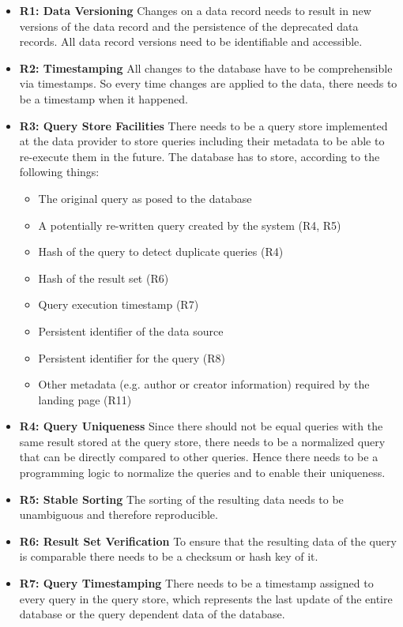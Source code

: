 \documentclass[draft,final]{vutinfth} %
\begin{document}
\begin{itemize}
	\item \textbf{R1: Data Versioning}
	Changes on a data record needs to result in new versions of the data record and the persistence of the deprecated data records. All data record versions need to be identifiable and accessible. 
	\item \textbf{R2: Timestamping}
	All changes to the database have to be comprehensible via timestamps. So every time changes are applied to the data, there needs to be a timestamp when it happened. 
	\item \textbf{R3: Query Store Facilities}
	There needs to be a query store implemented at the data provider to store queries including their metadata to be able to re-execute them in the future. The database has to store, according to \cite{rauber2016identification} the following things: 
	\begin{itemize}
		\item The original query as posed to the database
		\item A potentially re-written query created by the system (R4, R5)
		\item Hash of the query to detect duplicate queries (R4)
		\item Hash of the result set (R6)
		\item Query execution timestamp (R7)
		\item Persistent identifier of the data source
		\item Persistent identifier for the query (R8)
		\item Other metadata (e.g. author or creator information) required by the landing page (R11)
	\end{itemize}
	\item \textbf{R4: Query Uniqueness}
	Since there should not be equal queries with the same result stored at the query store, there needs to be a normalized query that can be directly compared to other queries. Hence there needs to be a programming logic to normalize the queries and to enable their uniqueness.
	\item \textbf{R5: Stable Sorting}
	The sorting of the resulting data needs to be unambiguous and therefore reproducible.
	\item \textbf{R6: Result Set Verification}
	To ensure that the resulting data of the query is comparable there needs to be a checksum or hash key of it. 
	\item \textbf{R7: Query Timestamping}
	There needs to be a timestamp assigned to every query in the query store, which represents the last update of the entire database or the query dependent data of the database.

\end{itemize}
\end{document}
